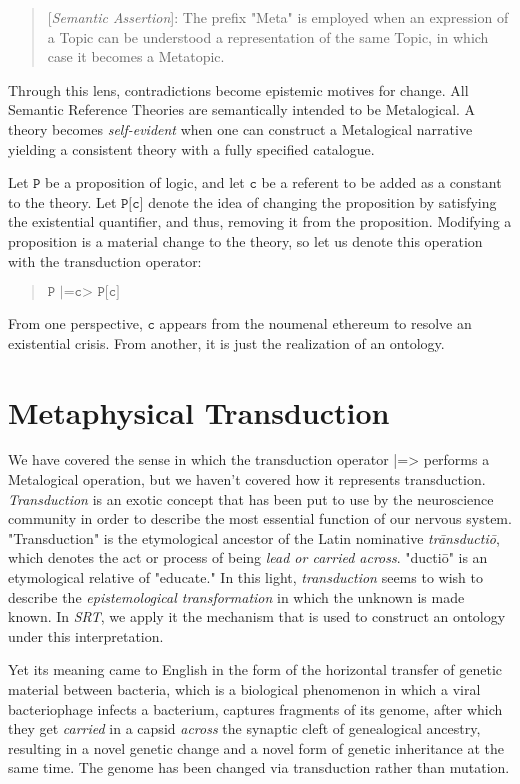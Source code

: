 \documentclass[runningheads]{llncs}
\begin{document}
\begin{quote}
[\emph{Semantic Assertion}]: The prefix "Meta" is employed when an expression of a {Topic} can be understood a representation of the same {Topic}, in which case it becomes a Meta{topic}.
\end{quote}

Through this lens, contradictions become epistemic motives for change. All Semantic Reference Theories are semantically intended to be Metalogical. A theory becomes \emph{self-evident} when one can construct a Metalogical narrative yielding a consistent theory with a fully specified catalogue.

Let $\texttt{P}$ be a proposition of logic, and let $\texttt{c}$ be a referent to be added as a constant to the theory. Let $\texttt{P[c]}$ denote the idea of changing the proposition by satisfying the existential quantifier, and thus, removing it from the proposition. Modifying a proposition is a material change to the theory, so let us denote this operation with the transduction operator:

\begin{quote}
$\texttt{P |=c> P[c]}$
\end{quote}

From one perspective, $\texttt{c}$ appears from the noumenal ethereum to resolve an existential crisis. From another, it is just the realization of an ontology.

\section{Metaphysical Transduction}

We have covered the sense in which the transduction operator |=> performs a Metalogical operation, but we haven't covered how it represents transduction. \emph{Transduction} is an exotic concept that has been put to use by the neuroscience community in order to describe the most essential function of our nervous system\cite{Hagins1970}. "Transduction" is the etymological ancestor of the Latin nominative \emph{trānsductiō}, which denotes the act or process of being \emph{lead or carried across}. "ductiō" is an etymological relative of "educate." In this light, \emph{transduction} seems to wish to describe the \emph{epistemological transformation} in which the unknown is made known. In \emph{SRT}, we apply it the mechanism that is used to construct an ontology under this interpretation.

Yet its meaning came to English in the form of the horizontal transfer of genetic material between bacteria, which is a biological phenomenon in which a viral bacteriophage infects a bacterium, captures fragments of its genome, after which they get \emph{carried} in a capsid \emph{across} the synaptic cleft of genealogical ancestry, resulting in a novel genetic change and a novel form of genetic inheritance at the same time. The genome has been changed via transduction rather than mutation\cite{Zinder1952}.
\end{document}
